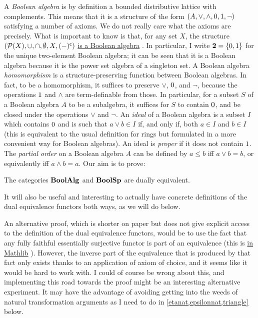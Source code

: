 \documentclass[a4paper,10pt]{article}
\numberwithin{theorem}{section}
\newcommand{\docref}[3]{%
    \href{%
        https://leanprover-community.github.io/mathlib4_docs/Mathlib/#1.html\##2%
    }{#3}%
}
\begin{document}
A \emph{Boolean algebra} is by definition a bounded distributive lattice with
complements. This means that it is a structure of the form $(A, \vee, \wedge,
0, 1, \neg)$ satisfying a number of axioms. We do not really care what
the axioms are precisely. What is important to know is that, for any set $X$,
the structure $(\mathcal{P}(X), \cup, \cap, \emptyset, X, (-)^{\mathsf{c}})$
\docref{Data/Set/Basic}{Set.instBooleanAlgebraSet}{is a Boolean algebra}.
In particular, I write $\mathbf{2} = \{ 0, 1 \}$ for the unique two-element
Boolean algebra; it can be seen that it is a Boolean algebra because it is the
power set algebra of a singleton set. A Boolean algebra \emph{homomorphism} is
a structure-preserving function between Boolean algebras. In fact, to be a
homomorphism, it suffices to preserve $\vee$, $0$, and $\neg$, because the
operations $1$ and $\wedge$ are term-definable from those. In particular,
for a subset $S$ of a Boolean algebra $A$ to be a subalgebra, it suffices for
$S$ to contain $0$, and be closed under the operations $\vee$ and $\neg$. An
\emph{ideal} of a Boolean algebra is a subset $I$ which contains $0$ and is
such that $a \vee b \in I$ if, and only if, both $a \in I$ and $b \in I$ (this
is equivalent to the usual definition for rings but formulated in a more
convenient way for Boolean algebras). An ideal is \emph{proper} if it does not
contain $1$. The \emph{partial order} on a Boolean algebra $A$ can be
defined by $a \leq b$ iff $a \vee b = b$, or equivalently  iff $a \wedge b =
a$. Our aim is to prove:
\begin{theorem}\label{BABoolSpdualeq} The categories $\mathbf{BoolAlg}$ and $\mathbf{BoolSp}$
    are dually equivalent.
\end{theorem}
It will also be useful and interesting to actually have concrete definitions of
the dual equivalence functors both ways, as we will do below. 
\begin{remark}
An alternative proof, which is shorter on paper but does not give explicit
access to the definition of the dual equivalence functors, would be to use the
fact that any fully faithful essentially surjective functor is part of an
equivalence (this is \docref{CategoryTheory/Equivalence}
{CategoryTheory.Equivalence.ofFullyFaithfullyEssSurj}{in Mathlib}). However,
the inverse part of the equivalence that is produced by that fact only exists
thanks to an application of axiom of choice, and it seems like it would be hard
to work with. I could of course be wrong about this, and implementing this road
towards the proof might be an interesting alternative experiment. It may have
the advantage of avoiding getting into the weeds of natural transformation
arguments as I need to do in \cref{etanat,epsilonnat,triangle} below.
\end{remark}
\end{document}
